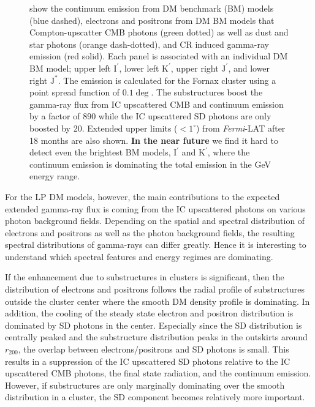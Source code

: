 \documentclass[10pt,aps,pra,reprint,amsmath,amsfonts,amssymb,showpacs,nofootinbib,floatfix]{revtex4-1}
\def\C#1{{\bf #1}}
\newcommand{\Fermi}{{\em Fermi}\xspace}
\newcommand{\rmn}{\mathrm}
\newcommand{\Kp}{\rmn{K}^\prime}
\newcommand{\Ip}{\rmn{I}^\prime}
\newcommand{\Js}{\rmn{J}^*}
\newcommand{\Jp}{\rmn{J}^\prime}
\newcommand{\rvir}{r_{200}}
\begin{document}
\begin{figure}
\begin{minipage}{2.0\columnwidth}
{  show the continuum emission from DM benchmark (BM) models (blue
  dashed), electrons and positrons from DM BM models that
  Compton-upscatter CMB photons (green dotted) as well as dust and
  star photons (orange dash-dotted), and CR induced gamma-ray emission
  (red solid). Each panel is associated with an individual DM BM
  model; upper left $\Ip$, lower left $\Kp$, upper right $\Jp$, and
  lower right $\Js$. The emission is calculated for the Fornax cluster
  using a point spread function of $0.1\deg$. The substructures boost
  the gamma-ray flux from IC upscattered CMB and continuum emission by
  a factor of 890 while the IC upscattered SD photons are only boosted
  by 20. Extended upper limits ($<1^\circ$) from \Fermi-LAT after 18
  months \protect \cite{2010ApJ...717L..71A} are also shown. \C{In the
    near future} we find it hard to detect even the brightest BM
  models, $\Ip$ and $\Kp$, where the continuum emission is dominating
  the total emission in the GeV energy range.}
 \label{fig:diff_BM}
\end{minipage}
\end{figure}

For the LP DM models, however, the main contributions
to the expected extended gamma-ray flux is coming from the IC
upscattered photons on various photon background fields. Depending on
the spatial and spectral distribution of electrons and positrons as
well as the photon background fields, the resulting spectral
distributions of gamma-rays can differ greatly. Hence it is interesting
to understand which spectral features and energy regimes are
dominating.

If the enhancement due to substructures in clusters is significant,
then the distribution of electrons and positrons follows the radial
profile of substructures outside the cluster center where the smooth
DM density profile is dominating. In addition, the cooling of the
steady state electron and positron distribution is dominated by SD
photons in the center. Especially since the SD distribution is
centrally peaked and the substructure distribution peaks in the
outskirts around $\rvir$, the overlap between electrons/positrons and
SD photons is small. This results in a suppression of the IC
upscattered SD photons relative to the IC upscattered CMB photons, the
final state radiation, and the continuum emission. However, if
substructures are only marginally dominating over the smooth
distribution in a cluster, the SD component becomes relatively more
important.
\end{document}
